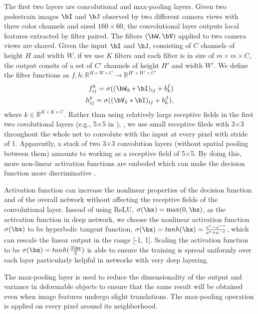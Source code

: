 \documentclass[10pt,journal,twocolumn]{IEEEtran}
\begin{document}
The first two layers are concolutional and max-pooling layers. Given two pedestrain images $\bI$ and $\bJ$ observed by two different camera views with three color channels and sized $160\times 60$, the convolutional layer outputs local features extracted by filter paired. The filters $(\bW,\bV)$ applied to two camera views are shared. Given the input $\bI$ and $\bJ$, consisting of $C$ channels of height $H$ and width $W$, if we use $K$ filters and each filter is in size of $m\times m \times C$, the output consits of a set of $C'$ channels of height $H'$ and width $W'$. We define the filter functions as $f, h: \mathbb{R}^{H\times W \times C} \rightarrow \mathbb{R}^{H' \times W' \times C'}$\begin{align}
f_{ij}^k = \sigma((\bW_k * \bI)_{ij} + b_k^I)\\\nonumber
h_{ij}^k = \sigma((\bV_k * \bI)_{ij} + b_k^J),\nonumber
\end{align}
where $k\in \mathbb{R}^{K\times K\times C}$. Rather than using relatively large receptive fields in the first two covolutional layers (e.g., 5$\times$5 in \cite{JointRe-id,FPNN}), , we use small receptive fileds with 3$\times$3 throughout the whole net to convolute with the input at every pixel with stride of 1. Apparently, a stack of two 3$\times$3 convolution layers (without spatial pooling between them) amounts to working as a receptive field of 5$\times$5. By doing this, more non-linear activation functions are embeded which can make the decision function more discriminative \cite{VGG}.

Activation function can increase the nonlinear properties of the decision function and of the overall network without affecting the receptive fields of the convolutional layer. Insead of using ReLU, $\sigma(\bx)=\max(0,\bx)$, as the  activation function in deep network, we choose the nonlinear activation function $\sigma(\bx)$ to be hyperbolic tangent function, $\sigma(\bx)=tanh(\bx)=\frac{e^{x} - e^{-x}}{e^{x} + e^{-x}}$, which can rescale the linear output in the range [-1, 1].  Scaling the activation function to be $\sigma(\bx)=tanh(\frac{3\bx}{2})$ is able to ensure the training is spread uniformly over each layer particularly helpful in networks with very deep layering.

The max-pooling layer is used to reduce the dimensionality of the output and variance in deformable objects to ensure that the same result will be obtained even when image features undergo slight translations. The max-pooling operation is applied on every pixel around its  neighborhood.
\end{document}

